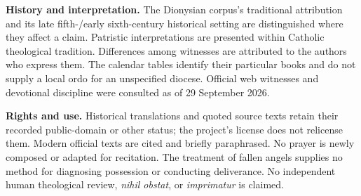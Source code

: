 \textbf{History and interpretation.} The Dionysian corpus's traditional
attribution and its late fifth-/early sixth-century historical setting are
distinguished where they affect a claim. Patristic interpretations are
presented within Catholic theological tradition. Differences among witnesses
are attributed to the authors who express them. The calendar tables identify
their particular books and do not supply a local ordo for an unspecified
diocese. Official web witnesses and devotional discipline were consulted as
of 29 September 2026.

\textbf{Rights and use.} Historical translations and quoted source texts
retain their recorded public-domain or other status; the project's license
does not relicense them. Modern official texts are cited and briefly
paraphrased. No prayer is newly composed or adapted for recitation. The
treatment of fallen angels supplies no method for diagnosing possession
or conducting deliverance. No independent human theological review,
\emph{nihil obstat}, or \emph{imprimatur} is claimed.
